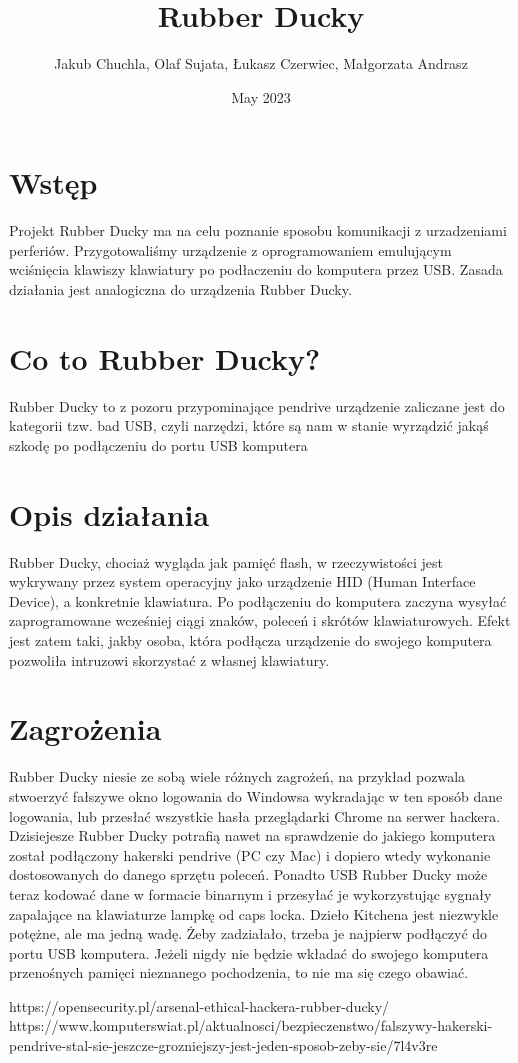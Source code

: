 \documentclass{article}
\title{Rubber Ducky}
\author{Jakub Chuchla, Olaf Sujata, Łukasz Czerwiec, Małgorzata Andrasz}
\date{May 2023}
\begin{document}
\maketitle

\section{Wstęp}
Projekt Rubber Ducky ma na celu poznanie sposobu komunikacji z urzadzeniami perferiów. Przygotowaliśmy urządzenie z oprogramowaniem emulującym wciśnięcia klawiszy klawiatury po podłaczeniu do komputera przez USB. Zasada działania jest analogiczna do urządzenia Rubber Ducky. 

\section{Co to Rubber Ducky?}

Rubber Ducky to z pozoru przypominające pendrive urządzenie zaliczane jest do kategorii tzw. bad USB, czyli narzędzi, które są nam w stanie wyrządzić jakąś szkodę po podłączeniu do portu USB komputera

\section{Opis działania}
Rubber Ducky, chociaż wygląda jak pamięć flash, w rzeczywistości jest wykrywany przez system operacyjny jako urządzenie HID (Human Interface Device), a konkretnie klawiatura. Po podłączeniu do komputera zaczyna wysyłać zaprogramowane wcześniej ciągi znaków, poleceń i skrótów klawiaturowych. Efekt jest zatem taki, jakby osoba, która podłącza urządzenie do swojego komputera pozwoliła intruzowi skorzystać z własnej klawiatury.

\section{Zagrożenia}
Rubber Ducky niesie ze sobą wiele różnych zagrożeń, na przykład pozwala stwoerzyć fałszywe okno logowania do Windowsa wykradając w ten sposób dane logowania, lub przesłać wszystkie hasła przeglądarki Chrome na serwer hackera. Dzisiejesze Rubber Ducky potrafią nawet na sprawdzenie do jakiego komputera został podłączony hakerski pendrive (PC czy Mac) i dopiero wtedy wykonanie dostosowanych do danego sprzętu poleceń. Ponadto USB Rubber Ducky może teraz kodować dane w formacie binarnym i przesyłać je wykorzystując sygnały zapalające na klawiaturze lampkę od caps locka. Dzieło Kitchena jest niezwykle potężne, ale ma jedną wadę. Żeby zadziałało, trzeba je najpierw podłączyć do portu USB komputera. Jeżeli nigdy nie będzie wkładać do swojego komputera przenośnych pamięci nieznanego pochodzenia, to nie ma się czego obawiać.




\begin{thebibliography}{9}

  https://opensecurity.pl/arsenal-ethical-hackera-rubber-ducky/
  https://www.komputerswiat.pl/aktualnosci/bezpieczenstwo/falszywy-hakerski-pendrive-stal-sie-jeszcze-grozniejszy-jest-jeden-sposob-zeby-sie/7l4v3re
  
  
\end{thebibliography}
\end{document}
